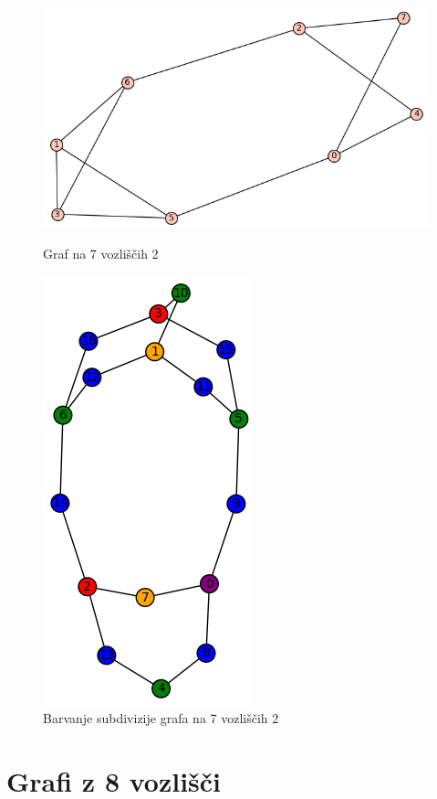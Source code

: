\documentclass[11pt,a4paper,titlepage]{article}
\begin{document}
\begin{figure}[H]
	\centering
	\begin{minipage}{0.45\textwidth}
		\centering
		\includegraphics[scale=0.55]{orig_7_2.png}
		\caption{Graf na 7 vozliščih 2}
	\end{minipage}
	\hfill
	\begin{minipage}{0.45\textwidth}
		\centering
		\includegraphics[scale=0.6]{sub_7_2.png}
		\caption{Barvanje subdivizije grafa na 7 vozliščih 2}
	\end{minipage}
\end{figure}
\pagebreak
\section{Grafi z 8 vozlišči}
\end{document}
